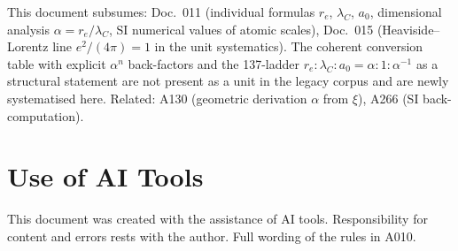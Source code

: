 This document subsumes: Doc.~011 (individual formulas $r_e$, $\lambda_C$, $a_0$,
dimensional analysis $\alpha=r_e/\lambda_C$, SI numerical values of atomic
scales), Doc.~015 (Heaviside--Lorentz line $e^2/(4\pi)=1$ in the unit
systematics). The coherent conversion table with explicit $\alpha^n$ back-factors
and the 137-ladder $r_e:\lambda_C:a_0=\alpha:1:\alpha^{-1}$ as a structural
statement are not present as a unit in the legacy corpus and are newly
systematised here. Related: A130 (geometric derivation $\alpha$ from $\xi$),
A266 (SI back-computation).

\section{Use of AI Tools}

This document was created with the assistance of AI tools. Responsibility
for content and errors rests with the author. Full wording of the rules in A010.
